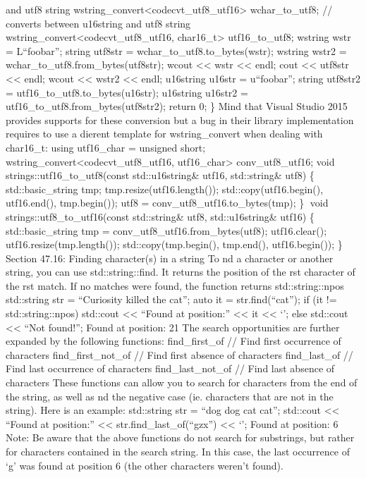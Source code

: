 and utf8 string
wstring\_convert\textless codecvt\_utf8\_utf16\textgreater{}
wchar\_to\_utf8; // converts between u16string and utf8 string
wstring\_convert\textless codecvt\_utf8\_utf16, char16\_t\textgreater{}
utf16\_to\_utf8; wstring wstr = L``foobar''; string utf8str =
wchar\_to\_utf8.to\_bytes(wstr); wstring wstr2 =
wchar\_to\_utf8.from\_bytes(utf8str); wcout \textless\textless{} wstr
\textless\textless{} endl; cout \textless\textless{} utf8str
\textless\textless{} endl; wcout \textless\textless{} wstr2
\textless\textless{} endl; u16string u16str = u``foobar''; string
utf8str2 = utf16\_to\_utf8.to\_bytes(u16str); u16string u16str2 =
utf16\_to\_utf8.from\_bytes(utf8str2); return 0; \} Mind that Visual
Studio 2015 provides supports for these conversion but a bug in their
library implementation requires to use a dierent template for
wstring\_convert when dealing with char16\_t: using utf16\_char =
unsigned short; wstring\_convert\textless codecvt\_utf8\_utf16,
utf16\_char\textgreater{} conv\_utf8\_utf16; void
strings::utf16\_to\_utf8(const std::u16string\& utf16, std::string\&
utf8) \{ std::basic\_string tmp; tmp.resize(utf16.length());
std::copy(utf16.begin(), utf16.end(), tmp.begin()); utf8 =
conv\_utf8\_utf16.to\_bytes(tmp); \} void
strings::utf8\_to\_utf16(const std::string\& utf8, std::u16string\&
utf16) \{ std::basic\_string tmp = conv\_utf8\_utf16.from\_bytes(utf8);
utf16.clear(); utf16.resize(tmp.length()); std::copy(tmp.begin(),
tmp.end(), utf16.begin()); \} Section 47.16: Finding character(s) in a
string To nd a character or another string, you can use
std::string::find. It returns the position of the rst character of the
rst match. If no matches were found, the function returns
std::string::npos std::string str = ``Curiosity killed the cat''; auto
it = str.find(``cat''); if (it != std::string::npos) std::cout
\textless\textless{} ``Found at position:'' \textless\textless{} it
\textless\textless{} `\n'; else std::cout \textless\textless{} ``Not
found!\n''; Found at position: 21 The search opportunities are further
expanded by the following functions: find\_first\_of // Find first
occurrence of characters find\_first\_not\_of // Find first absence of
characters find\_last\_of // Find last occurrence of characters
find\_last\_not\_of // Find last absence of characters These functions
can allow you to search for characters from the end of the string, as
well as nd the negative case (ie. characters that are not in the
string). Here is an example: std::string str = ``dog dog cat cat'';
std::cout \textless\textless{} ``Found at position:''
\textless\textless{} str.find\_last\_of(``gzx'') \textless\textless{}
`\n'; Found at position: 6 Note: Be aware that the above functions do
not search for substrings, but rather for characters contained in the
search string. In this case, the last occurrence of `g' was found at
position 6 (the other characters weren't found).

